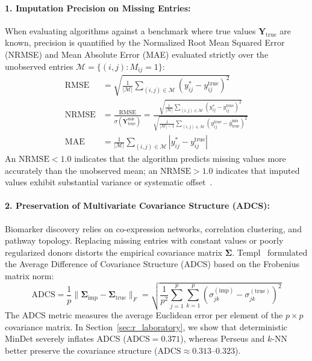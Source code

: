 \documentclass[11pt,oneside]{book}
\begin{document}
\paragraph{1. Imputation Precision on Missing Entries:}
When evaluating algorithms against a benchmark where true values $\mathbf{Y}_{\text{true}}$ are known, precision is quantified by the Normalized Root Mean Squared Error (NRMSE) and Mean Absolute Error (MAE) evaluated strictly over the unobserved entries $\mathcal{M} = \{(i,j) : M_{ij} = 1\}$:
\begin{align}
\text{RMSE} &= \sqrt{\frac{1}{|\mathcal{M}|} \sum_{(i,j) \in \mathcal{M}} \left( y_{ij}^* - y_{ij}^{\text{true}} \right)^2} \\
\text{NRMSE} &= \frac{\text{RMSE}}{\sigma(\mathbf{Y}_{\text{true}}^{\text{mis}})} = \frac{\sqrt{\frac{1}{|\mathcal{M}|} \sum_{(i,j) \in \mathcal{M}} \left( y_{ij}^* - y_{ij}^{\text{true}} \right)^2}}{\sqrt{\frac{1}{|\mathcal{M}|-1} \sum_{(i,j) \in \mathcal{M}} \left( y_{ij}^{\text{true}} - \bar{y}_{\text{true}}^{\text{mis}} \right)^2}} \\
\text{MAE} &= \frac{1}{|\mathcal{M}|} \sum_{(i,j) \in \mathcal{M}} \left| y_{ij}^* - y_{ij}^{\text{true}} \right|
\end{align}
An $\text{NRMSE} < 1.0$ indicates that the algorithm predicts missing values more accurately than the unobserved mean; an $\text{NRMSE} > 1.0$ indicates that imputed values exhibit substantial variance or systematic offset~\cite{templ2023visualization}.

\paragraph{2. Preservation of Multivariate Covariance Structure (ADCS):}
Biomarker discovery relies on co-expression networks, correlation clustering, and pathway topology. Replacing missing entries with constant values or poorly regularized donors distorts the empirical covariance matrix $\boldsymbol{\Sigma}$. Templ~\cite{templ2023visualization} formulated the Average Difference of Covariance Structure (ADCS) based on the Frobenius matrix norm:
\begin{equation}
\label{eq:adcs_metric}
\text{ADCS} = \frac{1}{p} \|\boldsymbol{\Sigma}_{\text{imp}} - \boldsymbol{\Sigma}_{\text{true}}\|_F = \sqrt{\frac{1}{p^2} \sum_{j=1}^p \sum_{k=1}^p \left( \sigma_{jk}^{(\text{imp})} - \sigma_{jk}^{(\text{true})} \right)^2}
\end{equation}
The ADCS metric measures the average Euclidean error per element of the $p \times p$ covariance matrix. In Section~\ref{sec:r_laboratory}, we show that deterministic MinDet severely inflates ADCS ($\text{ADCS} = 0.371$), whereas Perseus and $k$-NN better preserve the covariance structure ($\text{ADCS} \approx 0.313$--$0.323$).
\end{document}
